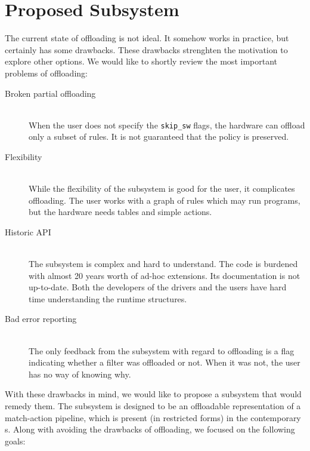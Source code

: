 \chapter{Proposed Subsystem}
\label{chap:rfc}

The current state of  offloading is not ideal. It somehow works in
practice, but certainly has some drawbacks. These drawbacks strenghten the
motivation to explore other options. We would like to shortly review the most
important problems of  offloading:

\begin{description}
	\item[Broken partial offloading] \hfill \\
		When the user does not specify the \Verb|skip_sw| flags, the hardware can
		offload only a subset of rules. It is not guaranteed that the policy is
		preserved.
	\item[Flexibility] \hfill \\
		While the flexibility of the  subsystem is good for the user, it
		complicates offloading. The user works with a graph of rules which may
		run programs, but the hardware needs tables and simple actions.
	\item[Historic API] \hfill \\
		The  subsystem is complex and hard to understand. The code is
		burdened with almost 20 years worth of ad-hoc extensions. Its
		documentation is not up-to-date. Both the developers of the drivers and the users
		have hard time understanding the runtime structures.
	\item[Bad error reporting] \hfill \\
		The only feedback from the subsystem with regard to offloading is
		a flag indicating whether a filter was offloaded or not. When it was not, the
		user has no way of knowing why.
\end{description}

\noindent With these drawbacks in mind, we would like to propose a subsystem that would
remedy them. The subsystem is designed to be an offloadable representation of
a match-action pipeline, which is present (in restricted forms) in the contemporary
s. Along with avoiding the drawbacks of  offloading, we focused on
the following goals:

